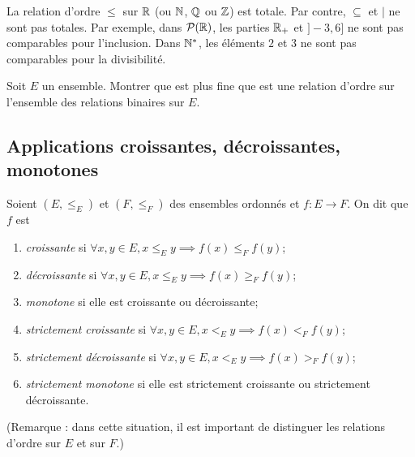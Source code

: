 \begin{exemples}
La relation d'ordre $\leq$ sur $\mathbb{R}$ (ou $\mathbb{N}$, $\mathbb{Q}$ ou  $\mathbb{Z}$) est totale. Par contre, $\subseteq$ et $|$ ne sont pas totales. Par exemple, dans $\mathcal P(\mathbb{R})$, les parties $\mathbb{R}_+$ et $]-3,6]$ ne sont pas comparables pour l'inclusion. Dans $\mathbb{N}^*$, les éléments $2$ et $3$ ne sont pas comparables pour la divisibilité.
\end{exemples}

\begin{exercice}
Soit $E$ un ensemble. Montrer que \og est plus fine que\fg{} est une relation d'ordre sur l'ensemble des relations binaires sur $E$.
\end{exercice}

\subsection{Applications croissantes, décroissantes, monotones}


\begin{definition}
Soient $(E,\leq_E)$ et $(F,\leq_F)$ des ensembles ordonnés et $f : E\to F$. On dit que $f$ est 
\begin{enumerate}
\item \emph{croissante} si $\forall x, y\in E, x\leq_E y \implies f(x) \leq_F f(y)$;
\item \emph{décroissante} si $\forall x, y\in E, x\leq_E y \implies f(x) \geq_F f(y)$;
\item \emph{monotone} si elle est croissante ou décroissante;
\item \emph{strictement croissante} si $\forall x, y\in E, x<_E y \implies f(x) <_F f(y)$;
\item \emph{strictement décroissante} si $\forall x, y\in E, x<_E y \implies f(x) >_F f(y)$;
\item \emph{strictement monotone} si elle est strictement croissante ou strictement décroissante.
\end{enumerate}
\end{definition}

(Remarque : dans cette situation, il est important de distinguer les relations d'ordre sur $E$ et sur $F$.)


